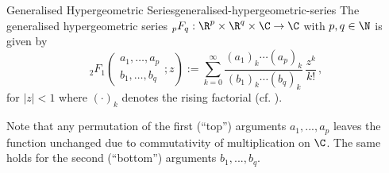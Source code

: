 \begin{definition}{Generalised Hypergeometric Series}{generalised-hypergeometric-series}
  The generalised hypergeometric series ${}_pF_q: \R^p \times \R^q \times \C \to \C$ with $p, q \in \N$ is given by
  $${}_2F_1\left(\begin{matrix}a_{1}, \ldots, a_{p} \\b_{1}, \ldots, b_{q}\end{matrix}; z\right) := \sum _{k=0}^{\infty }{\frac {(a_{1})_{k}\cdots (a_{p})_{k}}{(b_{1})_{k}\cdots (b_{q})_{k}}}\,{\frac {z^{k}}{k!}}\,,$$
  for $|z| < 1$ where $(\cdot)_k$ denotes the rising factorial (cf. ).
\end{definition}

Note that any permutation of the first (``top'') arguments $a_1, ..., a_p$ leaves the function unchanged due to commutativity of multiplication on $\C$. The same holds for the second (``bottom'') arguments $b_1, ..., b_q$.
